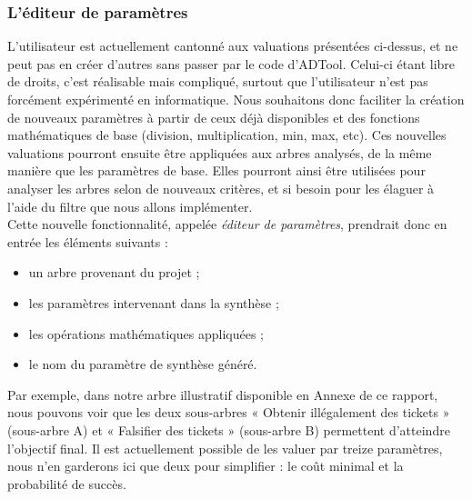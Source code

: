 		\subsubsection{L'éditeur de paramètres}
			\label{subsec::EditParam}

			L'utilisateur est actuellement cantonné aux valuations présentées ci-dessus, et ne peut pas en créer d'autres sans passer par le code d'ADTool. Celui-ci étant libre de droits, c'est réalisable mais compliqué, surtout que l'utilisateur n'est pas forcément expérimenté en informatique. %
			Nous souhaitons donc faciliter la création de nouveaux paramètres à partir de ceux déjà disponibles et des fonctions mathématiques de base (division, multiplication, min, max, etc). Ces nouvelles valuations pourront ensuite être appliquées aux arbres analysés, de la même manière que les paramètres de base. Elles pourront ainsi être utilisées pour analyser les arbres selon de nouveaux critères, et si besoin pour les élaguer à l'aide du filtre que nous allons implémenter.\\

			Cette nouvelle fonctionnalité, appelée \emph{éditeur de paramètres}, prendrait donc en entrée les éléments suivants :
			\begin{itemize}[label=,font=\color{magenta},parsep=0cm,itemsep=0cm, leftmargin=0cm]
				\item un arbre provenant du projet ; %
				\item les paramètres intervenant dans la synthèse ;
				\item les opérations mathématiques appliquées ;
				\item le nom du paramètre de synthèse généré.
			\end{itemize}

			Par exemple, dans notre arbre illustratif disponible en Annexe de ce rapport, nous pouvons voir que les deux sous-arbres « Obtenir illégalement des tickets » (sous-arbre A) et « Falsifier des tickets » (sous-arbre B) permettent d'atteindre l'objectif final. Il est actuellement possible de les valuer par treize paramètres, nous n'en garderons ici que deux pour simplifier : le coût minimal et la probabilité de succès.\\ %

